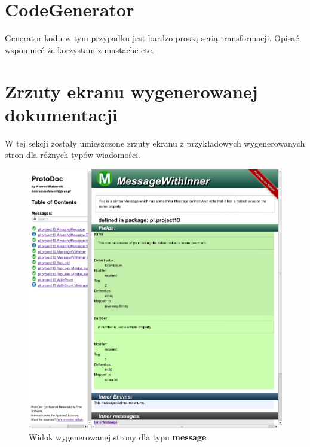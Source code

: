 \documentclass[pdflatex,11pt]{aghdpl}
\begin{document}
\section{CodeGenerator}
Generator kodu w tym przypadku jest bardzo prostą serią transformacji.
Opisać, wspomnieć że korzystam z mustache etc.


\newpage
\section{Zrzuty ekranu wygenerowanej dokumentacji}
\label{sec:screenshots}
W tej sekcji zostały umieszczone zrzuty ekranu z przykładowych wygenerowanych stron dla różnych typów wiadomości.

\begin{figure}[hc]
 \begin{center}
  \includegraphics[width=\textwidth]{../protodoc_main.png}
 \end{center}
 \caption{Widok wygenerowanej strony dla typu \textbf{message}}
 \label{msg_page}
\end{figure}
\end{document}
